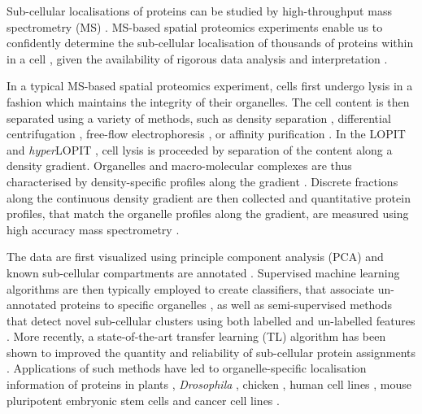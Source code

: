 \documentclass[12pt,english]{article}
\begin{document}
Sub-cellular localisations of proteins
can be studied by high-throughput mass spectrometry (MS)
\citep{Gatto:2010}. MS-based spatial proteomics experiments enable us
to confidently determine the sub-cellular localisation of thousands of
proteins within in a cell \citep{hyper}, given the availability of
rigorous data analysis and interpretation \citep{Gatto:2010}.

In a typical MS-based spatial proteomics experiment, cells first
undergo lysis in a fashion which maintains the integrity of their
organelles. The cell content is then separated using a variety of
methods, such as density separation \citep{Dunkley:2006,hyper},
differential centrifugation \citep{Itzhak:2016}, free-flow
electrophoresis \citep{Parsons:2014}, or affinity purification
\citep{Heard:2015}. In the LOPIT \citep{Dunkley:2004, Dunkley:2006,
  Sadowski:2006} and \textit{hyper}LOPIT \citep{Mulvey:2017}, cell
lysis is proceeded by separation of the content along a density
gradient. Organelles and macro-molecular complexes are thus
characterised by density-specific profiles along the gradient
\citep{DeDuve:1981}.  Discrete fractions along the continuous density
gradient are then collected and quantitative protein profiles, that
match the organelle profiles along the gradient, are measured using
high accuracy mass spectrometry \citep{Mulvey:2017}.

The data are first visualized using principle component
analysis (PCA) and known sub-cellular compartments are annotated
\citep{ghrepo}. Supervised machine learning algorithms are then typically
employed to create classifiers, that associate un-annotated
proteins to specific organelles \citep{Gatto:2014b}, as well
as semi-supervised methods that detect novel sub-cellular
clusters using both labelled and un-labelled features
\citep{Breckels:2013}. More recently, a state-of-the-art
transfer learning (TL) algorithm has been shown to improved
the quantity and reliability of sub-cellular protein
assignments \citep{Breckels:2016}. Applications of such
methods have led to organelle-specific localisation
information of proteins in plants \citep{Dunkley:2006}, \textit{Drosophila}
\citep{Tan:2009}, chicken \citep{hall:2009}, human cell lines
\citep{Breckels:2013}, mouse pluripotent embryonic stem cells
\citep{hyper} and cancer cell lines \citep{Thul:2017}.
\end{document}

